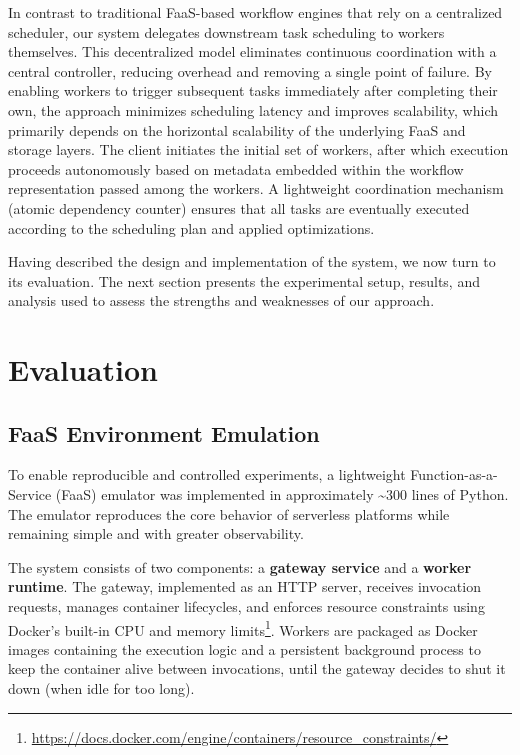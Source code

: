 \documentclass[conference]{IEEEtran}
\begin{document}
In contrast to traditional FaaS-based workflow engines that rely on a centralized scheduler, our system delegates downstream task scheduling to workers themselves. This decentralized model eliminates continuous coordination with a central controller, reducing overhead and removing a single point of failure. By enabling workers to trigger subsequent tasks immediately after completing their own, the approach minimizes scheduling latency and improves scalability, which primarily depends on the horizontal scalability of the underlying FaaS and storage layers. The client initiates the initial set of workers, after which execution proceeds autonomously based on metadata embedded within the workflow representation passed among the workers. A lightweight coordination mechanism (atomic dependency counter) ensures that all tasks are eventually executed according to the scheduling plan and applied optimizations.

Having described the design and implementation of the system, we now turn to its evaluation. The next section presents the experimental setup, results, and analysis used to assess the strengths and weaknesses of our approach.


\section{Evaluation}
\label{s:evaluation}

\subsection{FaaS Environment Emulation}
\label{ss:faas_emulator}

To enable reproducible and controlled experiments, a lightweight Function-as-a-Service (FaaS) emulator was implemented in approximately \textasciitilde300 lines of Python. The emulator reproduces the core behavior of serverless platforms while remaining simple and with greater observability.

The system consists of two components: a \textbf{gateway service} and a \textbf{worker runtime}. The gateway, implemented as an HTTP server, receives invocation requests, manages container lifecycles, and enforces resource constraints using Docker's built-in CPU and memory limits\footnote{\url{https://docs.docker.com/engine/containers/resource_constraints/}}. Workers are packaged as Docker images containing the execution logic and a persistent background process to keep the container alive between invocations, until the gateway decides to shut it down (when idle for too long).
\end{document}
